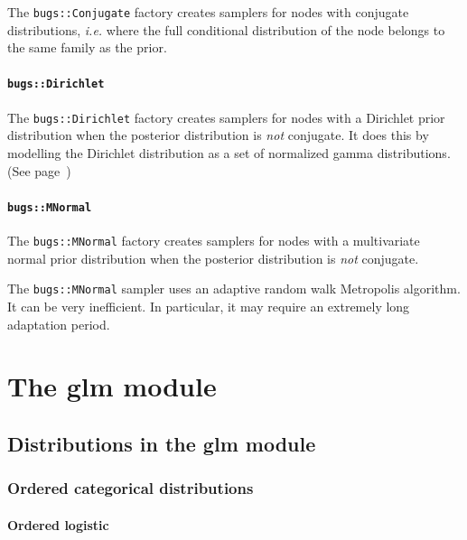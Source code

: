 \documentclass[11pt, a4paper, titlepage]{report}
\begin{document}
The \texttt{bugs::Conjugate} factory creates samplers for nodes with
conjugate distributions, {\em i.e.} where the full conditional
distribution of the node belongs to the same family as the prior.

\subsubsection{\texttt{bugs::Dirichlet}}

The \texttt{bugs::Dirichlet} factory creates samplers for nodes with a
Dirichlet prior distribution when the posterior distribution is {\em
  not} conjugate. It does this by modelling the Dirichlet distribution
as a set of normalized gamma distributions. (See page~\pageref{bugs:ddirch})

\subsubsection{\texttt{bugs::MNormal}}

The \texttt{bugs::MNormal} factory creates samplers for nodes with a
multivariate normal prior distribution when the posterior distribution
is {\em not} conjugate.

The \texttt{bugs::MNormal} sampler uses an adaptive random walk
Metropolis algorithm. It can be very inefficient. In particular, it
may require an extremely long adaptation period.


\chapter{The glm module}
\label{chapter:glm}

\section{Distributions in the glm module}
\label{section:glm:distributions}

\subsection{Ordered categorical distributions}
\label{glm:dordered.categorical}

\subsubsection{Ordered logistic}
\end{document}
